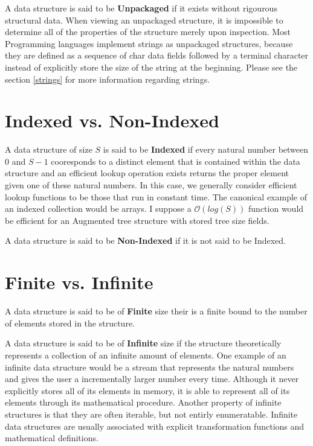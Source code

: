 \documentclass[12pt, letterpaper]{book}
\newcommand{\bigO}{\mathcal{O}}
\begin{document}
A data structure is said to be \textbf{Unpackaged} if it exists without rigourous structural data. When viewing an unpackaged structure, it is impossible to determine all of the properties of the structure merely upon inspection. Most Programming languages implement strings as unpackaged structures, because they are defined as a sequence of char data fields followed by a terminal character instead of explicitly store the size of the string at the beginning. Please see the section \ref{strings} for more information regarding strings.

\section{Indexed vs. Non-Indexed}

A data structure of size $S$ is said to be \textbf{Indexed} if every natural number between 0 and $S-1$ cooresponds to a distinct element that is contained within the data structure and an efficient lookup operation exists returns the proper element given one of these natural numbers. In this case, we generally consider efficient lookup functions to be those that run in constant time. The canonical example of an indexed collection would be arrays. I suppose a $\bigO(log(S))$ function would be efficient for an Augmented tree structure with stored tree size fields.

A data structure is said to be \textbf{Non-Indexed} if it is not said to be Indexed.

\section{Finite vs. Infinite}

A data structure is said to be of \textbf{Finite} size their is a finite bound to the number of elements stored in the structure.

A data structure is said to be of \textbf{Infinite} size if the structure theoretically represents a collection of an infinite amount of elements. One example of an infinite data structure would be a stream that represents the natural numbers and gives the user a incrementally larger number every time. Although it never explicitly stores all of its elements in memory, it is able to represent all of its elements through its mathematical procedure. Another property of infinite structures is that they are often iterable, but not entirly enumeratable. Infinite data structures are usually associated with explicit transformation functions and mathematical definitions.
\end{document}
